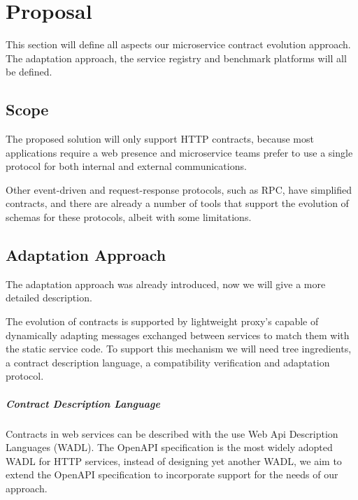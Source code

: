 
%

\chapter{Proposal}
\label{cha:proposal}

This section will define all aspects our microservice contract evolution approach.
The adaptation approach, the service registry and benchmark platforms will all be defined.

\section{Scope} %
\label{sec:scope}

The proposed solution will only support HTTP contracts, because
most applications require a web presence and
microservice teams prefer to use a single protocol for both internal and external communications.

Other event-driven and request-response protocols, such as RPC,
have simplified contracts, and there are already a number of tools that support the evolution of schemas for these protocols,
albeit with some limitations.

\section{Adaptation Approach} %
\label{sec:adaptation_approach}

The adaptation approach was already introduced, now we will give a more detailed description.

The evolution of contracts is supported by lightweight proxy's capable of dynamically adapting messages exchanged between services to match them with the static service code.
To support this mechanism we will need tree ingredients, a contract description language, a compatibility verification and adaptation protocol.

\paragraph{Contract Description Language}

Contracts in web services can be described with the use Web Api Description Languages (WADL).
The OpenAPI specification is the most widely adopted WADL for HTTP services, instead of designing yet another WADL,
we aim to extend the OpenAPI specification to incorporate support for the needs of our approach.

